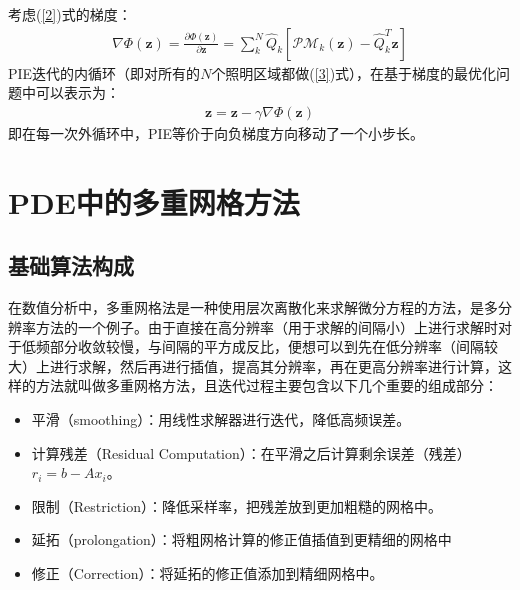 \documentclass[10pt,aspectratio=169]{beamer} %
\renewcommand{\vec}[1]{\boldsymbol{#1}} %
\begin{document}
\begin{frame}
    考虑(\ref{2})式的梯度：
    \begin{align}
        \nabla  \Phi (\vec{z}) = \frac{\partial \Phi (\vec{z})}{\partial \vec{z}} = \sum_k^N \hat{Q}_k [\mathcal{PM}_k(\vec{z})-\hat{Q}_k^T \vec{z}]
    \end{align}
    PIE迭代的内循环（即对所有的$N$个照明区域都做(\ref{3})式），在基于梯度的最优化问题中可以表示为：
    \begin{align}
        \vec{z}=\vec{z}-\gamma \nabla \Phi (\vec{z})
    \end{align}
    即在每一次外循环中，PIE等价于向负梯度方向移动了一个小步长。
\end{frame}

\section{PDE中的多重网格方法}

\subsection{基础算法构成}

\begin{frame}
    在数值分析中，多重网格法是一种使用层次离散化来求解微分方程的方法，是多分辨率方法的一个例子。由于直接在高分辨率（用于求解的间隔小）上进行求解时对于低频部分收敛较慢，与间隔的平方成反比，便想可以到先在低分辨率（间隔较大）上进行求解，然后再进行插值，提高其分辨率，再在更高分辨率进行计算，这样的方法就叫做多重网格方法，且迭代过程主要包含以下几个重要的组成部分：
    \begin{itemize}
        \item 平滑（smoothing）：用线性求解器进行迭代，降低高频误差。
        \item 计算残差（Residual Computation）：在平滑之后计算剩余误差（残差）$r_i=b-Ax_i$。
        \item 限制（Restriction）：降低采样率，把残差放到更加粗糙的网格中。
        \item 延拓（prolongation）：将粗网格计算的修正值插值到更精细的网格中
        \item 修正（Correction）：将延拓的修正值添加到精细网格中。
    \end{itemize}
\end{frame}
\end{document}
